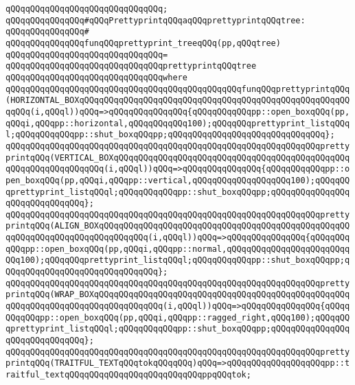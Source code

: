 \verb|qQQqqQQqqQQqqQQqqQQqqQQqqQQqqQQq;|\newline
\newline
\verb|qQQqqQQqqQQqqQQq#qQQqPrettyprintqQQqaqQQqprettyprintqQQqtree:|\newline
\verb|qQQqqQQqqQQqqQQq#|\newline
\verb|qQQqqQQqqQQqqQQqfunqQQqprettyprint_treeqQQq(pp,qQQqtree)|\newline
\verb|qQQqqQQqqQQqqQQqqQQqqQQqqQQqqQQq=|\newline
\verb|qQQqqQQqqQQqqQQqqQQqqQQqqQQqqQQqprettyprintqQQqtree|\newline
\verb|qQQqqQQqqQQqqQQqqQQqqQQqqQQqqQQqwhere|\newline
\verb|qQQqqQQqqQQqqQQqqQQqqQQqqQQqqQQqqQQqqQQqqQQqqQQqfunqQQqprettyprintqQQq(HORIZONTAL_BOXqQQqqQQqqQQqqQQqqQQqqQQqqQQqqQQqqQQqqQQqqQQqqQQqqQQqqQQqqQQq(i,qQQql))qQQq=>qQQqqQQqqQQqqQQq{qQQqqQQqqQQqpp::open_boxqQQq(pp,qQQqi,qQQqpp::horizontal,qQQqqQQqqQQq100);qQQqqQQqprettyprint_listqQQql;qQQqqQQqqQQqpp::shut_boxqQQqpp;qQQqqQQqqQQqqQQqqQQqqQQqqQQqqQQq};|\newline
\verb|qQQqqQQqqQQqqQQqqQQqqQQqqQQqqQQqqQQqqQQqqQQqqQQqqQQqqQQqqQQqqQQqprettyprintqQQq(VERTICAL_BOXqQQqqQQqqQQqqQQqqQQqqQQqqQQqqQQqqQQqqQQqqQQqqQQqqQQqqQQqqQQqqQQqqQQq(i,qQQql))qQQq=>qQQqqQQqqQQqqQQq{qQQqqQQqqQQqpp::open_boxqQQq(pp,qQQqi,qQQqpp::vertical,qQQqqQQqqQQqqQQqqQQq100);qQQqqQQqprettyprint_listqQQql;qQQqqQQqqQQqpp::shut_boxqQQqpp;qQQqqQQqqQQqqQQqqQQqqQQqqQQqqQQq};|\newline
\verb|qQQqqQQqqQQqqQQqqQQqqQQqqQQqqQQqqQQqqQQqqQQqqQQqqQQqqQQqqQQqqQQqprettyprintqQQq(ALIGN_BOXqQQqqQQqqQQqqQQqqQQqqQQqqQQqqQQqqQQqqQQqqQQqqQQqqQQqqQQqqQQqqQQqqQQqqQQqqQQqqQQq(i,qQQql))qQQq=>qQQqqQQqqQQqqQQq{qQQqqQQqqQQqpp::open_boxqQQq(pp,qQQqi,qQQqpp::normal,qQQqqQQqqQQqqQQqqQQqqQQqqQQq100);qQQqqQQqprettyprint_listqQQql;qQQqqQQqqQQqpp::shut_boxqQQqpp;qQQqqQQqqQQqqQQqqQQqqQQqqQQqqQQq};|\newline
\verb|qQQqqQQqqQQqqQQqqQQqqQQqqQQqqQQqqQQqqQQqqQQqqQQqqQQqqQQqqQQqqQQqprettyprintqQQq(WRAP_BOXqQQqqQQqqQQqqQQqqQQqqQQqqQQqqQQqqQQqqQQqqQQqqQQqqQQqqQQqqQQqqQQqqQQqqQQqqQQqqQQqqQQq(i,qQQql))qQQq=>qQQqqQQqqQQqqQQq{qQQqqQQqqQQqpp::open_boxqQQq(pp,qQQqi,qQQqpp::ragged_right,qQQq100);qQQqqQQqprettyprint_listqQQql;qQQqqQQqqQQqpp::shut_boxqQQqpp;qQQqqQQqqQQqqQQqqQQqqQQqqQQqqQQq};|\newline
\newline
\verb|qQQqqQQqqQQqqQQqqQQqqQQqqQQqqQQqqQQqqQQqqQQqqQQqqQQqqQQqqQQqqQQqprettyprintqQQq(TRAITFUL_TEXTqQQqtokqQQqqQQq)qQQq=>qQQqqQQqqQQqqQQqqQQqpp::traitful_textqQQqqQQqqQQqqQQqqQQqqQQqqQQqppqQQqtok;|\newline
